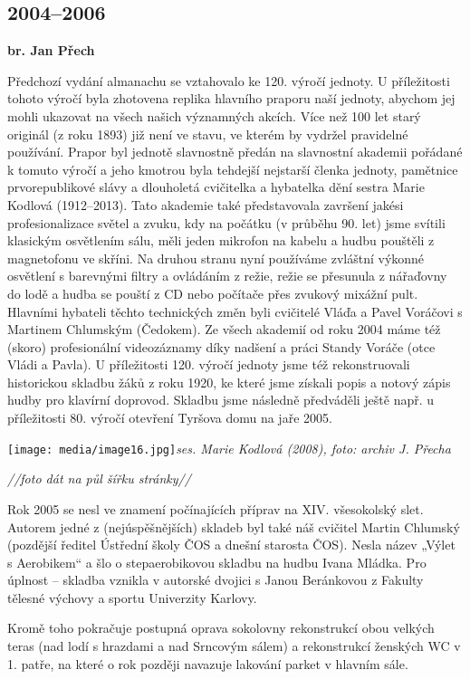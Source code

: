 \subsection{2004--2006}\label{section}

\textbf{br. Jan Přech}

Předchozí vydání almanachu se vztahovalo ke 120. výročí jednoty. U
příležitosti tohoto výročí byla zhotovena replika hlavního praporu naší
jednoty, abychom jej mohli ukazovat na všech našich významných akcích.
Více než 100 let starý originál (z roku 1893) již není ve stavu, ve
kterém by vydržel pravidelné používání. Prapor byl jednotě slavnostně
předán na slavnostní akademii pořádané k tomuto výročí a jeho kmotrou
byla tehdejší nejstarší členka jednoty, pamětnice prvorepublikové slávy
a dlouholetá cvičitelka a hybatelka dění sestra Marie Kodlová
(1912--2013). Tato akademie také představovala završení jakési
profesionalizace světel a zvuku, kdy na počátku (v průběhu 90. let) jsme
svítili klasickým osvětlením sálu, měli jeden mikrofon na kabelu a hudbu
pouštěli z magnetofonu ve skříni. Na druhou stranu nyní používáme
zvláštní výkonné osvětlení s barevnými filtry a ovládáním z režie, režie
se přesunula z nářaďovny do lodě a hudba se pouští z CD nebo počítače
přes zvukový mixážní pult. Hlavními hybateli těchto technických změn
byli cvičitelé Vláďa a Pavel Voráčovi s Martinem Chlumským (Čedokem). Ze
všech akademií od roku 2004 máme též (skoro) profesionální videozáznamy
díky nadšení a práci Standy Voráče (otce Vládi a Pavla). U příležitosti
120. výročí jednoty jsme též rekonstruovali historickou skladbu žáků z
roku 1920, ke které jsme získali popis a notový zápis hudby pro klavírní
doprovod. Skladbu jsme následně předváděli ještě např. u příležitosti
80. výročí otevření Tyršova domu na jaře 2005.

\texttt{[image: media/image16.jpg]}\emph{ses.
Marie Kodlová (2008), foto: archiv J. Přecha}

\emph{//foto dát na půl šířku stránky//}

Rok 2005 se nesl ve znamení počínajících příprav na XIV. všesokolský
slet. Autorem jedné z (nejúspěšnějších) skladeb byl také náš cvičitel
Martin Chlumský (pozdější ředitel Ústřední školy ČOS a dnešní starosta
ČOS). Nesla název „Výlet s Aerobikem`` a šlo o stepaerobikovou skladbu
na hudbu Ivana Mládka. Pro úplnost -- skladba vznikla v autorské dvojici
s Janou Beránkovou z Fakulty tělesné výchovy a sportu Univerzity
Karlovy.

Kromě toho pokračuje postupná oprava sokolovny rekonstrukcí obou velkých
teras (nad lodí s hrazdami a nad Srncovým sálem) a rekonstrukcí ženských
WC v 1. patře, na které o rok později navazuje lakování parket v hlavním
sále.

